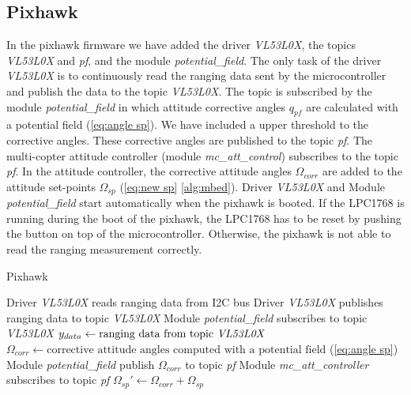 \subsection{Pixhawk}
\label{subs:pixhawk}
In the pixhawk firmware we have added the driver \textit{VL53L0X}, the topics \textit{VL53L0X} and \textit{pf}, and the module \textit{potential\_field}. The only task of the driver \textit{VL53L0X} is to continuously read the ranging data sent by the microcontroller and publish the data to the topic \textit{VL53L0X}. The topic is subscribed by the module \textit{potential\_field} in which attitude corrective angles $q_{pf}$ are calculated with a potential field (\cref{eq:angle sp}). We have included a upper threshold to the corrective angles. These corrective angles are published to the topic \textit{pf}. The multi-copter attitude controller (module \textit{mc\_att\_control}) subscribes to the topic \textit{pf}. In the attitude controller, the corrective attitude angles $\Omega_{corr}$ are added to the attitude set-points $\Omega_{sp}$ (\cref{eq:new sp} \cref{alg:mbed}). Driver \textit{VL53L0X} and Module \textit{potential\_field} start automatically when the pixhawk is booted. If the LPC1768 is running during the boot of the pixhawk, the LPC1768 has to be reset by pushing the button on top of the microcontroller. Otherwise, the pixhawk is not able to read the ranging measurement correctly. 

\begin{algorithm}
	\caption{Pixhawk}\label{alg:mbed}
	\begin{algorithmic}[1]
		\State Driver  \textit{VL53L0X} reads ranging data from I2C bus 
		\State Driver  \textit{VL53L0X} publishes ranging data to topic \textit{VL53L0X}
		\State Module \textit{potential\_field} subscribes to topic \textit{VL53L0X}
		\State $y_{data}\gets \text{ranging data from topic \textit{VL53L0X}}$
		\State $\Omega_{corr} \gets \text{corrective attitude angles computed with a potential field}$ (\cref{eq:angle sp})
		\State Module \textit{potential\_field} publish $\Omega_{corr}$ to topic \textit{pf}
		\State Module \textit{mc\_att\_controller} subscribes to topic \textit{pf}
		\State $\Omega_{sp}'\gets \Omega_{corr}+\Omega_{sp}$ 
		\EndProcedure
	\end{algorithmic}
\end{algorithm}

